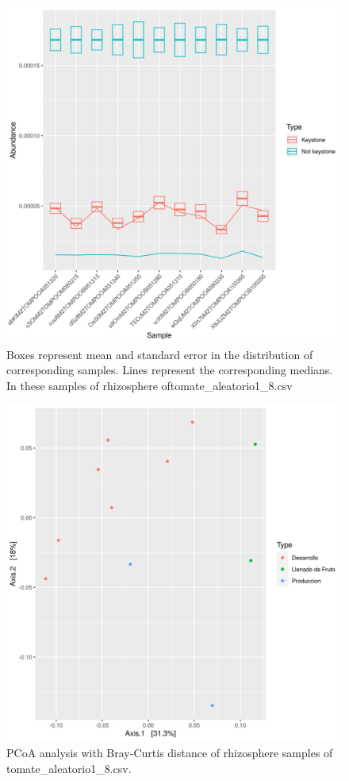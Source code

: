 \begin{figure}
 \centering
 \includegraphics[scale = 0.75]{mean_median_key_vs_not_key_tomate_aleatorio1_8.csv.png}
\caption{Boxes represent mean and standard error in the distribution of corresponding samples. Lines represent the corresponding medians. In these samples of rhizosphere oftomate_aleatorio1_8.csv}
\label{mean_median_tomate_aleatorio1_8.csv}
\end{figure}
\begin{figure}
   \centering
   \includegraphics[scale = 0.7]{pcoa_muestras_tomate_aleatorio1_8.csv.png}
 \caption{PCoA analysis with Bray-Curtis distance of rhizosphere samples of tomate_aleatorio1_8.csv.}
 \label{fig:tomate_aleatorio1_8.csv_pcoa}
\end{figure}
